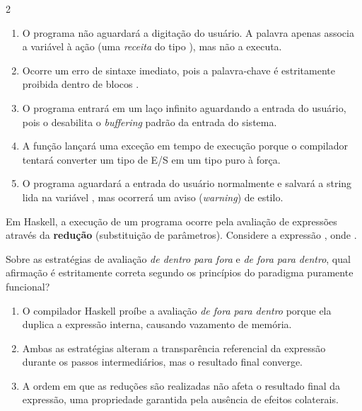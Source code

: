 \documentclass[a4paper,10pt,brazil]{article}
\begin{document}
\begin{multicols}{2}
\begin{enumerate}
  \item O programa não aguardará a digitação do usuário. A palavra  apenas associa a variável  à ação (uma \emph{receita} do tipo ), mas não a executa.

  \item Ocorre um erro de sintaxe imediato, pois a palavra-chave  é estritamente proibida dentro de blocos .

  \item O programa entrará em um laço infinito aguardando a entrada do usuário, pois o  desabilita o \emph{buffering} padrão da entrada do sistema.

  \item A função  lançará uma exceção em tempo de execução porque o compilador tentará converter um tipo de E/S em um tipo puro à força.

  \item O programa aguardará a entrada do usuário normalmente e salvará a string lida na variável , mas ocorrerá um aviso (\emph{warning}) de estilo.


\end{enumerate}

Em Haskell, a execução de um programa ocorre pela avaliação de expressões através da \textbf{redução} (substituição de parâmetros). Considere a expressão , onde . 

Sobre as estratégias de avaliação \emph{de dentro para fora} e \emph{de fora para dentro}, qual afirmação é estritamente correta segundo os princípios do paradigma puramente funcional?

\begin{enumerate}
  \item O compilador Haskell proíbe a avaliação \emph{de fora para dentro} porque ela duplica a expressão interna, causando vazamento de memória.

  \item Ambas as estratégias alteram a transparência referencial da expressão durante os passos intermediários, mas o resultado final converge.

  \item A ordem em que as reduções são realizadas não afeta o resultado final da expressão, uma propriedade garantida pela ausência de efeitos colaterais.


\end{enumerate}
\end{multicols}
\end{document}
